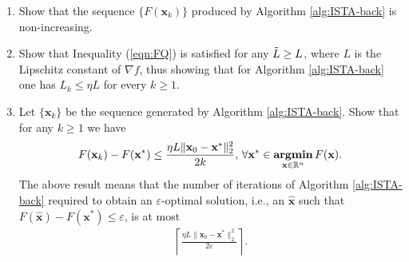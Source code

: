 \documentclass[11pt,letter,notitlepage]{article}
\DeclareMathOperator*{\argmin}{\bf argmin}
\begin{document}
\begin{exercise}
\begin{algorithm}[H]
\begin{algorithmic}[1]
	\end{algorithmic}
\end{algorithm}

\begin{enumerate}
    \item Show that the sequence $\{F(\textbf{x}_k)\}$ produced by Algorithm \ref{alg:ISTA-back} is non-increasing.

    \item Show that Inequality (\ref{eqn:FQ}) is satisfied for any $\Tilde{L}\ge L$, where $L$ is the Lipschitz constant of $\nabla f$, thus showing that for Algorithm \ref{alg:ISTA-back} one has $L_k\le \eta L$ for every $k\ge 1$.

    \item Let $\{\textbf{x}_k\}$ be the sequence generated by Algorithm \ref{alg:ISTA-back}. Show that for any $k\ge 1$ we have
    \begin{align*}
        F(\textbf{x}_k)-F(\textbf{x}^*)\le \frac{\eta L \|\textbf{x}_0-\textbf{x}^*\|_2^2}{2k},\,\forall \textbf{x}^*\in \argmin_{\textbf{x}\in\mathbb{R}^n} F(\textbf{x}).
    \end{align*}
    The above result means that the number of iterations of Algorithm \ref{alg:ISTA-back} required to obtain an $\varepsilon$-optimal solution, i.e., an $\hat{\textbf{x}}$ such that $F(\hat{\textbf{x}})-F(\textbf{x}^*)\le \varepsilon$, is at most
    \begin{align*}
        \left\lceil \frac{\eta L \|\textbf{x}_0-\textbf{x}^*\|_2^2}{2\varepsilon} \right\rceil.
    \end{align*}
\end{enumerate}


\end{exercise}
\begin{solution}

\end{solution}
\end{document}
